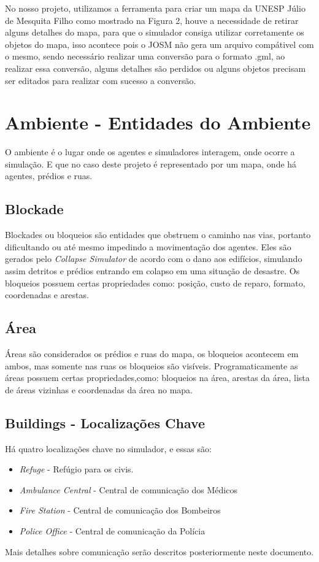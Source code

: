 \documentclass[conference]{IEEEtran}
\begin{document}
No nosso projeto, utilizamos a ferramenta para criar um mapa da UNESP Júlio de Mesquita Filho como mostrado na Figura 2, houve a necessidade de retirar alguns detalhes do mapa, para que o simulador consiga utilizar corretamente os objetos do mapa, isso acontece pois o JOSM não gera um arquivo compátivel com o mesmo, sendo necessário realizar uma conversão para o formato .gml, ao realizar essa conversão, alguns detalhes são perdidos ou alguns objetos precisam ser editados para realizar com sucesso a conversão.

\section{Ambiente - Entidades do Ambiente}
O ambiente é o lugar onde os agentes e simuladores interagem, onde ocorre a simulação. E que no caso deste projeto é representado por um mapa, onde há agentes, prédios e ruas.
\subsection{Blockade}
Blockades ou bloqueios são entidades que obstruem o caminho nas vias, portanto dificultando ou até mesmo impedindo a movimentação dos agentes.
Eles são gerados pelo \textit{Collapse Simulator} de acordo com o dano aos edifícios, simulando assim detritos e prédios entrando em colapso em uma situação de desastre. Os bloqueios possuem certas propriedades como: posição, custo de reparo, formato, coordenadas e arestas.

\subsection{Área}
Áreas são considerados os prédios e ruas do mapa, os bloqueios acontecem em ambos, mas somente nas ruas os bloqueios são visíveis. Programaticamente as áreas possuem certas propriedades,como: bloqueios na área, arestas da área, lista de áreas vizinhas e coordenadas da área no mapa.
\subsection{Buildings - Localizações Chave}
Há quatro localizações chave no simulador, e essas são:
\begin{itemize}
\item \textit {Refuge} - Refúgio para os civis.
\item \textit {Ambulance Central} - Central de comunicação dos Médicos
\item \textit {Fire Station} - Central de comunicação dos Bombeiros
\item \textit {Police Office} - Central de comunicação da Polícia
\end{itemize}
Mais detalhes sobre comunicação serão descritos posteriormente neste documento.
\end{document}
